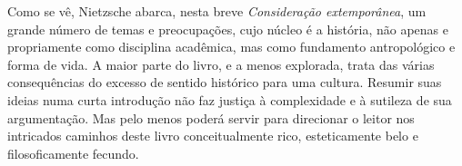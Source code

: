Como se vê, Nietzsche abarca, nesta breve \emph{Consideração
extemporânea}, um grande número de temas e preocupações, cujo núcleo é a
história, não apenas e propriamente como disciplina acadêmica, mas como
fundamento antropológico e forma de vida. A maior parte do livro, e a
menos explorada, trata das várias consequências do excesso de sentido
histórico para uma cultura. Resumir suas ideias numa curta introdução
não faz justiça à complexidade e à sutileza de sua argumentação. Mas
pelo menos poderá servir para direcionar o leitor nos intricados
caminhos deste livro conceitualmente rico, esteticamente belo e
filosoficamente fecundo.
